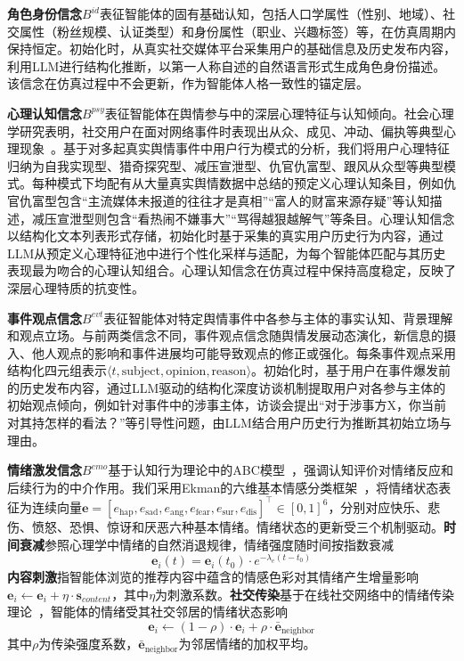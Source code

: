 \documentclass[a4paper,fleqn]{cas-dc}
\begin{document}
\textbf{角色身份信念}$B^{id}$表征智能体的固有基础认知，包括人口学属性（性别、地域）、社交属性（粉丝规模、认证类型）和身份属性（职业、兴趣标签）等，在仿真周期内保持恒定。初始化时，从真实社交媒体平台采集用户的基础信息及历史发布内容，利用LLM进行结构化推断，以第一人称自述的自然语言形式生成角色身份描述。该信念在仿真过程中不会更新，作为智能体人格一致性的锚定层。

\textbf{心理认知信念}$B^{psy}$表征智能体在舆情参与中的深层心理特征与认知倾向。社会心理学研究表明，社交用户在面对网络事件时表现出从众、成见、冲动、偏执等典型心理现象~\citep{buckels2014trolls}。基于对多起真实舆情事件中用户行为模式的分析，我们将用户心理特征归纳为自我实现型、猎奇探究型、减压宣泄型、仇官仇富型、跟风从众型等典型模式。每种模式下均配有从大量真实舆情数据中总结的预定义心理认知条目，例如仇官仇富型包含“主流媒体未报道的往往才是真相”“富人的财富来源存疑”等认知描述，减压宣泄型则包含“看热闹不嫌事大”“骂得越狠越解气”等条目。心理认知信念以结构化文本列表形式存储，初始化时基于采集的真实用户历史行为内容，通过LLM从预定义心理特征池中进行个性化采样与适配，为每个智能体匹配与其历史表现最为吻合的心理认知组合。心理认知信念在仿真过程中保持高度稳定，反映了深层心理特质的抗变性。

\textbf{事件观点信念}$B^{evt}$表征智能体对特定舆情事件中各参与主体的事实认知、背景理解和观点立场。与前两类信念不同，事件观点信念随舆情发展动态演化，新信息的摄入、他人观点的影响和事件进展均可能导致观点的修正或强化。每条事件观点采用结构化四元组表示$\langle t, \text{subject}, \text{opinion}, \text{reason} \rangle$。初始化时，基于用户在事件爆发前的历史发布内容，通过LLM驱动的结构化深度访谈机制提取用户对各参与主体的初始观点倾向，例如针对事件中的涉事主体，访谈会提出“对于涉事方X，你当前对其持怎样的看法？”等引导性问题，由LLM结合用户历史行为推断其初始立场与理由。

\textbf{情绪激发信念}$B^{emo}$基于认知行为理论中的ABC模型~\citep{ellis_reason_1962}，强调认知评价对情绪反应和后续行为的中介作用。我们采用Ekman的六维基本情感分类框架~\citep{ekman_basic_1992}，将情绪状态表征为连续向量$\mathbf{e} = [e_{\text{hap}}, e_{\text{sad}}, e_{\text{ang}}, e_{\text{fear}}, e_{\text{sur}}, e_{\text{dis}}]^\top \in [0,1]^6$，分别对应快乐、悲伤、愤怒、恐惧、惊讶和厌恶六种基本情绪。情绪状态的更新受三个机制驱动。\textbf{时间衰减}参照心理学中情绪的自然消退规律，情绪强度随时间按指数衰减
\begin{equation}
\mathbf{e}_i(t) = \mathbf{e}_i(t_0) \cdot e^{-\lambda_e(t-t_0)}
\end{equation}
\textbf{内容刺激}指智能体浏览的推荐内容中蕴含的情感色彩对其情绪产生增量影响$\mathbf{e}_i \leftarrow \mathbf{e}_i + \eta \cdot \mathbf{s}_{content}$，其中$\eta$为刺激系数。\textbf{社交传染}基于在线社交网络中的情绪传染理论~\citep{hatfield_emotional_1994,kramer_experimental_2014,fan2023emotional_contagion}，智能体的情绪受其社交邻居的情绪状态影响
\begin{equation}
\mathbf{e}_i \leftarrow (1-\rho) \cdot \mathbf{e}_i + \rho \cdot \bar{\mathbf{e}}_{\text{neighbor}}
\end{equation}
其中$\rho$为传染强度系数，$\bar{\mathbf{e}}_{\text{neighbor}}$为邻居情绪的加权平均。
\end{document}
